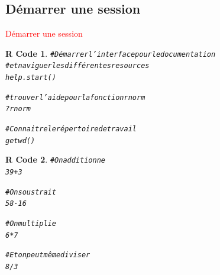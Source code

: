 \documentclass[11pt]{beamer}\usepackage[]{graphicx}\usepackage[]{color}
\makeatletter
\newcommand{\hlnum}[1]{\textcolor[rgb]{0.063,0.58,0.627}{#1}}%
\newcommand{\hlcom}[1]{\textcolor[rgb]{0.588,0.588,0.588}{#1}}%
\newcommand{\hlopt}[1]{\textcolor[rgb]{0.196,0.196,0.196}{#1}}%
\newcommand{\hlstd}[1]{\textcolor[rgb]{0.196,0.196,0.196}{#1}}%
\newcommand{\hlkwd}[1]{\textcolor[rgb]{0.78,0.227,0.412}{#1}}%
\newenvironment{kframe}{%
 \def\at@end@of@kframe{}%
 \ifinner\ifhmode%
  \def\at@end@of@kframe{\end{minipage}}%
  \begin{minipage}{\columnwidth}%
 \fi\fi%
 \def\FrameCommand##1{\hskip\@totalleftmargin \hskip-\fboxsep
 \colorbox{shadecolor}{##1}\hskip-\fboxsep
     \hskip-\linewidth \hskip-\@totalleftmargin \hskip\columnwidth}%
 \MakeFramed {\advance\hsize-\width
   \@totalleftmargin\z@ \linewidth\hsize
   \@setminipage}}%
 {\par\unskip\endMakeFramed%
 \at@end@of@kframe}
\newenvironment{knitrout}{}{} %
\newtheorem{rcode}{R Code}[section]
\makeatother
\begin{document}
\subsection{D\'{e}marrer une session}

\begin{frame}
 \begin{center}
  \Huge{\textcolor{red}{D\'{e}marrer une session}}
 \end{center}
\end{frame}


\begingroup
\makeatletter
\setlength{\hoffset}{-.5\beamer@sidebarwidth}
\makeatother
\begin{frame}
\begin{knitrout}
\color{fgcolor}\begin{kframe}
\begin{rcode}\begin{alltt}
\hlcom{# Démarrer l'interface pour le documentation}
\hlcom{# et naviguer les différentes resources}
\hlkwd{help.start}\hlstd{()}

\hlcom{# trouver l'aide pour la fonction rnorm}
\hlopt{?}\hlstd{rnorm}

\hlcom{# Connaitre le répertoire de travail}
\hlkwd{getwd}\hlstd{()}
\end{alltt}
\end{rcode}\end{kframe}
\end{knitrout}
\end{frame}





\begin{frame}
\begin{knitrout}
\color{fgcolor}\begin{kframe}
\begin{rcode}\begin{alltt}
\hlcom{# On additionne}
\hlnum{39} \hlopt{+} \hlnum{3}

\hlcom{# On soustrait}
\hlnum{58} \hlopt{-} \hlnum{16}

\hlcom{# On multiplie}
\hlnum{6} \hlopt{*} \hlnum{7}

\hlcom{# Et on peut même diviser}
\hlnum{8} \hlopt{/} \hlnum{3}
\end{alltt}
\end{rcode}\end{kframe}
\end{knitrout}
\end{frame}
\end{document}
